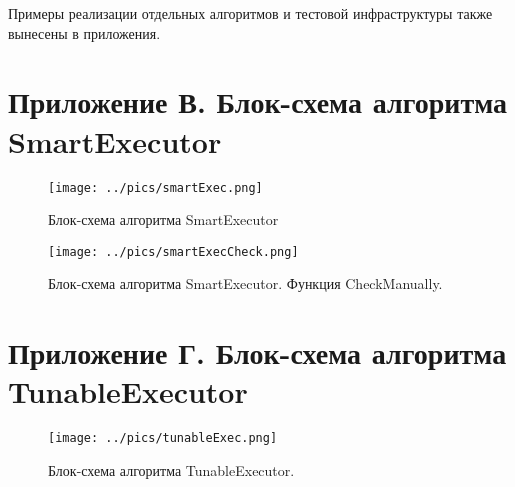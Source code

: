 \documentclass{matmex-diploma}
\begin{document}
    Примеры реализации отдельных алгоритмов и тестовой инфраструктуры также вынесены в приложения.



    
    
\section*{Приложение В. Блок-схема алгоритма SmartExecutor}
    \begin{figure}[H]
        \centering
        \texttt{[image: ../pics/smartExec.png]}
        \caption{Блок-схема алгоритма SmartExecutor}
        \label{smartAlgo}
    \end{figure}
    \begin{figure}[H]
        \centering
        \texttt{[image: ../pics/smartExecCheck.png]}
        \caption{Блок-схема алгоритма SmartExecutor. Функция CheckManually.}
        \label{smartCheck}
    \end{figure}
\section*{Приложение Г. Блок-схема алгоритма TunableExecutor}
    \begin{figure}[H]
        \centering
        \texttt{[image: ../pics/tunableExec.png]}
        \caption{Блок-схема алгоритма TunableExecutor.}
        \label{smartCheck}
    \end{figure}
\end{document}
